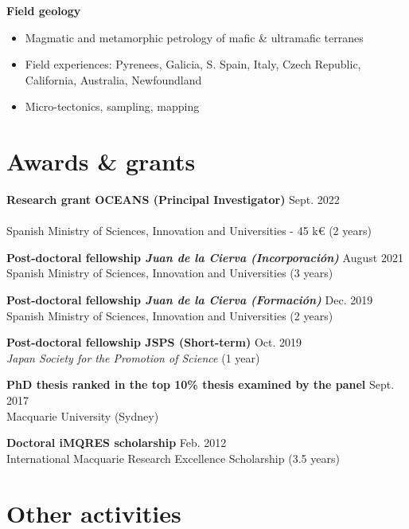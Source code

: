 \documentclass[a4paper,11pt]{article}
\begin{document}
    \textbf{Field geology}
    \begin{itemize}[itemsep=0pt,parsep=2pt]
        \item Magmatic and metamorphic petrology of mafic \& ultramafic terranes
        \item Field experiences: Pyrenees, Galicia, S. Spain, Italy, Czech Republic, California, Australia, Newfoundland
        \item Micro-tectonics, sampling, mapping
    \end{itemize}

\section{Awards \& grants}

    \textbf{Research grant OCEANS (Principal Investigator)}
    \hfill {Sept. 2022}\\
    \\
    Spanish Ministry of Sciences, Innovation and Universities - 45 k€ (2 years)
    
    \textbf{Post-doctoral fellowship \textit{Juan de la Cierva (Incorporación)}}
    \hfill {August 2021}\\
    Spanish Ministry of Sciences, Innovation and Universities (3 years)
    
    \textbf{Post-doctoral fellowship \textit{Juan de la Cierva (Formación)}}
    \hfill {Dec. 2019}\\
    Spanish Ministry of Sciences, Innovation and Universities (2 years)
    
    \textbf{Post-doctoral fellowship JSPS (Short-term)}
    \hfill {Oct. 2019}\\
    \textit{Japan Society for the Promotion of Science} (1 year)
    
    \textbf{PhD thesis ranked in the top 10\% thesis examined by the panel}
    \hfill {Sept. 2017}\\
    Macquarie University (Sydney)
    
    \textbf{Doctoral iMQRES scholarship}
    \hfill {Feb. 2012}\\
    International Macquarie Research Excellence Scholarship (3.5 years)

\section{Other activities}
\end{document}
